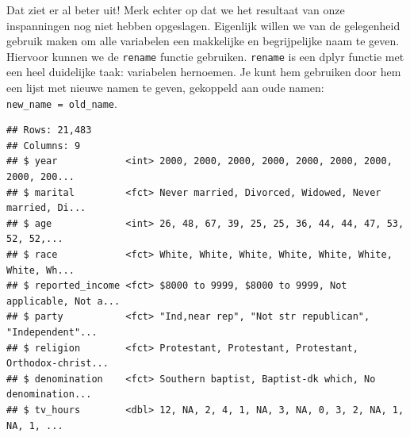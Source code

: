\documentclass[]{tufte-book}
\newenvironment{Shaded}{}{}
\newcommand{\DataTypeTok}[1]{\textcolor[rgb]{0.56,0.13,0.00}{#1}}
\newcommand{\KeywordTok}[1]{\textcolor[rgb]{0.00,0.44,0.13}{\textbf{#1}}}
\newcommand{\NormalTok}[1]{#1}
\newcommand{\OperatorTok}[1]{\textcolor[rgb]{0.40,0.40,0.40}{#1}}
\newcommand{\StringTok}[1]{\textcolor[rgb]{0.25,0.44,0.63}{#1}}
\begin{document}
Dat ziet er al beter uit! Merk echter op dat we het resultaat van onze inspanningen nog niet hebben opgeslagen. Eigenlijk willen we van de gelegenheid gebruik maken om alle variabelen een makkelijke en begrijpelijke naam te geven. Hiervoor kunnen we de \texttt{rename} functie gebruiken. \texttt{rename} is een dplyr functie met een heel duidelijke taak: variabelen hernoemen. Je kunt hem gebruiken door hem een lijst met nieuwe namen te geven, gekoppeld aan oude namen: \texttt{new\_name\ =\ old\_name}.

\begin{Shaded}
\end{Shaded}

\begin{verbatim}
## Rows: 21,483
## Columns: 9
## $ year            <int> 2000, 2000, 2000, 2000, 2000, 2000, 2000, 2000, 200...
## $ marital         <fct> Never married, Divorced, Widowed, Never married, Di...
## $ age             <int> 26, 48, 67, 39, 25, 25, 36, 44, 44, 47, 53, 52, 52,...
## $ race            <fct> White, White, White, White, White, White, White, Wh...
## $ reported_income <fct> $8000 to 9999, $8000 to 9999, Not applicable, Not a...
## $ party           <fct> "Ind,near rep", "Not str republican", "Independent"...
## $ religion        <fct> Protestant, Protestant, Protestant, Orthodox-christ...
## $ denomination    <fct> Southern baptist, Baptist-dk which, No denomination...
## $ tv_hours        <dbl> 12, NA, 2, 4, 1, NA, 3, NA, 0, 3, 2, NA, 1, NA, 1, ...
\end{verbatim}
\end{document}
